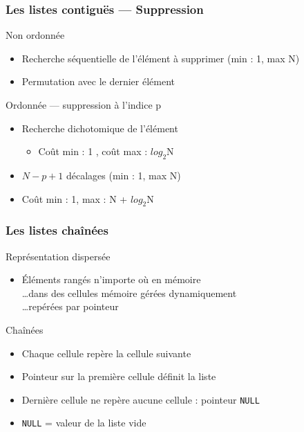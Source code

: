 \documentclass[table,handout,tikz,12pt,svgnames]{beamer}
\begin{document}
\begin{frame}[fragile=singleslide]
	\frametitle{Les listes contiguës --- Suppression}
	\begin{block}{Non ordonnée}
		\begin{itemize}
			\item Recherche séquentielle de l'élément à supprimer (min : 1, max N)
			\item Permutation avec le dernier élément
		\end{itemize}
	\end{block}
	\begin{block}{Ordonnée --- suppression à l'indice p}
		\begin{itemize}
			\item Recherche dichotomique de l'élément
			\begin{itemize}
				\item Coût min : 1 , coût max : $log_2$N
			\end{itemize}
			\item $N-p+1$ décalages (min : 1, max N)
			\item Coût min : 1, max : N + $log_2$N
		\end{itemize}
	\end{block}
\end{frame}


\begin{frame}[fragile=singleslide]
	\frametitle{Les listes chaînées}
	\begin{block}{Représentation dispersée}
		\begin{itemize}
			\item Éléments rangés n'importe où en mémoire\\
			\ldots dans des cellules mémoire gérées dynamiquement\\
			\ldots repérées par pointeur
		\end{itemize}
	\end{block}
	\begin{block}{Chaînées}
		\begin{itemize}
			\item Chaque cellule repère la cellule suivante
			\item Pointeur sur la première cellule définit la liste
			\item Dernière cellule ne repère aucune cellule : pointeur \texttt{NULL}
			\item \texttt{NULL} = valeur de la liste vide
		\end{itemize}
	\end{block}
\end{frame}
\end{document}
